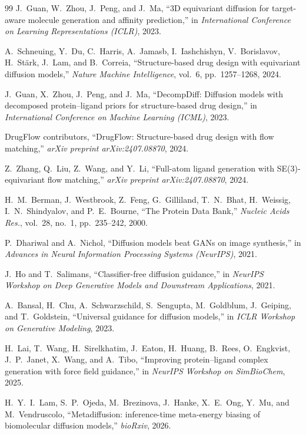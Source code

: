 \documentclass[11pt,letterpaper]{article}
\begin{document}
\begin{thebibliography}{99}
J.~Guan, W.~Zhou, J.~Peng, and J.~Ma,
``3D equivariant diffusion for target-aware molecule generation and affinity
prediction,''
in \emph{International Conference on Learning Representations (ICLR)}, 2023.

A.~Schneuing, Y.~Du, C.~Harris, A.~Jamasb, I.~Iashchishyn, V.~Borislavov,
H.~St\"{a}rk, J.~Lam, and B.~Correia,
``Structure-based drug design with equivariant diffusion models,''
\emph{Nature Machine Intelligence}, vol.~6, pp.~1257--1268, 2024.

J.~Guan, X.~Zhou, J.~Peng, and J.~Ma,
``DecompDiff: Diffusion models with decomposed protein--ligand priors for
structure-based drug design,''
in \emph{International Conference on Machine Learning (ICML)}, 2023.

DrugFlow contributors,
``DrugFlow: Structure-based drug design with flow matching,''
\emph{arXiv preprint arXiv:2407.08870}, 2024.

Z.~Zhang, Q.~Liu, Z.~Wang, and Y.~Li,
``Full-atom ligand generation with SE(3)-equivariant flow matching,''
\emph{arXiv preprint arXiv:2407.08870}, 2024.

H.~M.~Berman, J.~Westbrook, Z.~Feng, G.~Gilliland, T.~N.~Bhat, H.~Weissig,
I.~N.~Shindyalov, and P.~E.~Bourne,
``The Protein Data Bank,''
\emph{Nucleic Acids Res.}, vol.~28, no.~1, pp.~235--242, 2000.

P.~Dhariwal and A.~Nichol,
``Diffusion models beat GANs on image synthesis,''
in \emph{Advances in Neural Information Processing Systems (NeurIPS)}, 2021.

J.~Ho and T.~Salimans,
``Classifier-free diffusion guidance,''
in \emph{NeurIPS Workshop on Deep Generative Models and Downstream Applications},
2021.

A.~Bansal, H.~Chu, A.~Schwarzschild, S.~Sengupta, M.~Goldblum, J.~Geiping,
and T.~Goldstein,
``Universal guidance for diffusion models,''
in \emph{ICLR Workshop on Generative Modeling}, 2023.

H.~Lai, T.~Wang, H.~Sirelkhatim, J.~Eaton, H.~Huang, B.~Rees, O.~Engkvist,
J.~P.~Janet, X.~Wang, and A.~Tibo,
``Improving protein--ligand complex generation with force field guidance,''
in \emph{NeurIPS Workshop on SimBioChem}, 2025.

H.~Y.~I.~Lam, S.~P.~Ojeda, M.~Brezinova, J.~Hanke, X.~E.~Ong, Y.~Mu, and
M.~Vendruscolo,
``Metadiffusion: inference-time meta-energy biasing of biomolecular diffusion
models,''
\emph{bioRxiv}, 2026.


\end{thebibliography}
\end{document}
